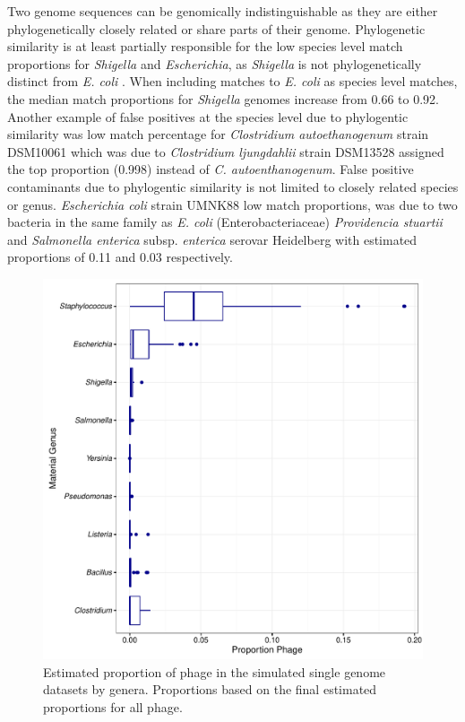 \documentclass[fleqn,10pt,lineno]{wlpeerj}\usepackage[]{graphicx}\usepackage[]{color}
\makeatletter
\def\maxwidth{ %
  \ifdim\Gin@nat@width>\linewidth
    \linewidth
  \else
    \Gin@nat@width
  \fi
}
\newenvironment{knitrout}{}{} %
\makeatother
\begin{document}
Two genome sequences can be genomically indistinguishable as they are either phylogenetically closely related or share parts of their genome.
Phylogenetic similarity is at least partially responsible for the low species level match proportions for  \textit{Shigella} and \textit{Escherichia}, as \textit{Shigella} is not phylogenetically distinct from \textit{E. coli} \citep{lan2002escherichia}.
When including matches to \textit{E. coli} as species level matches, the median match proportions for \textit{Shigella} genomes increase from 0.66 to 0.92. 
Another example of false positives at the species level due to phylogentic similarity was low match percentage for \textit{Clostridium autoethanogenum} strain DSM10061 which was due to  \textit{Clostridium ljungdahlii} strain DSM13528 assigned the top proportion (0.998) instead of \textit{C. autoenthanogenum}. 
False positive contaminants due to phylogentic similarity is not limited to closely related species or genus.
\textit{Escherichia coli} strain UMNK88 low match proportions, was due to two bacteria in the same family as \textit{E. coli} 
(Enterobacteriaceae) \textit{Providencia stuartii} and \textit{Salmonella enterica} subsp. \textit{enterica} serovar Heidelberg with estimated proportions of 0.11 and 0.03 respectively. 

\begin{knitrout}
\color{fgcolor}\begin{figure}
\includegraphics[width=\maxwidth]{figure/phage_prop-1} \caption[Estimated proportion of phage in the simulated single genome datasets by genera]{Estimated proportion of phage in the simulated single genome datasets by genera.  Proportions based on the final estimated proportions for all phage.}\label{fig:phage_prop}
\end{figure}


\end{knitrout}
\end{document}
